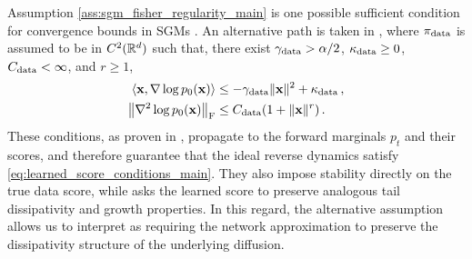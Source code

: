 \documentclass[11pt]{article}
\theoremstyle{plain}
\theoremstyle{definition}
\theoremstyle{remark}
\begin{document}
Assumption \ref{ass:sgm_fisher_regularity_main} is one possible sufficient condition for convergence bounds in SGMs \citep{conforti_kl}. An alternative path is taken in  \citet{strasman2026forgetting}, where $\pi_{\mathrm{data}}$ is assumed to be in $C^2(\mathbb{R}^d)$ such that, there exist $\gamma_{\rm data}>\alpha/2$, $\kappa_{\rm data}\ge0$, $C_{\rm data}<\infty$, and $r\ge1$,
\begin{align*}
    \left<\mathbf{x}, \nabla\log p_0(\mathbf{x})\right>
    &\le -\gamma_{\rm data}\|\mathbf{x}\|^2+\kappa_{\rm data}
    \,,
    \\
    \left\|\nabla^2\log p_0(\mathbf{x})\right\|_{\rm F}
    &\le C_{\rm data}(1+\|\mathbf{x}\|^r) \,.
\end{align*}
These conditions, as proven in \citet{strasman2026forgetting}, propagate to the forward marginals $p_t$ and their scores, and therefore guarantee that the ideal reverse dynamics satisfy \eqref{eq:learned_score_conditions_main}. They also impose stability directly on the true data score, while  asks the learned score to preserve analogous tail dissipativity and growth properties. In this regard, the alternative assumption allows us to interpret  as requiring the network approximation to preserve the dissipativity structure of the underlying diffusion.



\end{document}
